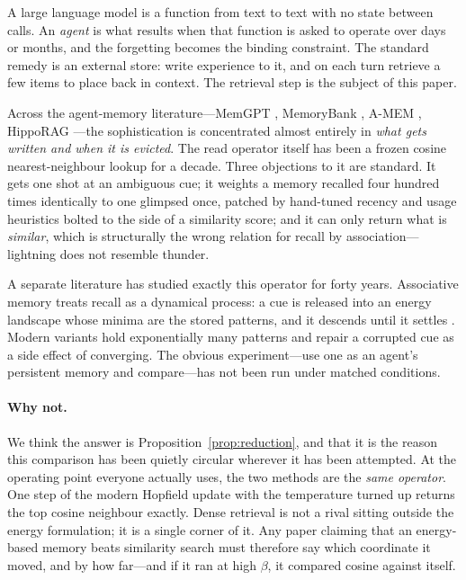 A large language model is a function from text to text with no state between calls. An
\emph{agent} is what results when that function is asked to operate over days or months,
and the forgetting becomes the binding constraint. The standard remedy is an external
store: write experience to it, and on each turn retrieve a few items to place back in
context. The retrieval step is the subject of this paper.

Across the agent-memory literature---MemGPT \citep{packer2023memgpt}, MemoryBank
\citep{zhong2024memorybank}, A-MEM \citep{xu2025amem}, HippoRAG
\citep{gutierrez2024hipporag}---the sophistication is concentrated almost entirely in
\emph{what gets written and when it is evicted}. The read operator itself has been a frozen
cosine nearest-neighbour lookup for a decade. Three objections to it are standard. It gets
one shot at an ambiguous cue; it weights a memory recalled four hundred times identically to
one glimpsed once, patched by hand-tuned recency and usage heuristics bolted to the side of
a similarity score; and it can only return what is \emph{similar}, which is structurally the
wrong relation for recall by association---lightning does not resemble thunder.

A separate literature has studied exactly this operator for forty years. Associative memory
treats recall as a dynamical process: a cue is released into an energy landscape whose minima
are the stored patterns, and it descends until it settles \citep{hopfield1982}. Modern
variants hold exponentially many patterns \citep{krotov2016dense,ramsauer2021hopfield} and
repair a corrupted cue as a side effect of converging. The obvious experiment---use one as
an agent's persistent memory and compare---has not been run under matched conditions.

\paragraph{Why not.} We think the answer is Proposition~\ref{prop:reduction}, and that it is
the reason this comparison has been quietly circular wherever it has been attempted. At the
operating point everyone actually uses, the two methods are the \emph{same operator}. One
step of the modern Hopfield update with the temperature turned up returns the top cosine
neighbour exactly. Dense retrieval is not a rival sitting outside the energy formulation; it
is a single corner of it. Any paper claiming that an energy-based memory beats similarity
search must therefore say which coordinate it moved, and by how far---and if it ran at high
$\beta$, it compared cosine against itself.

